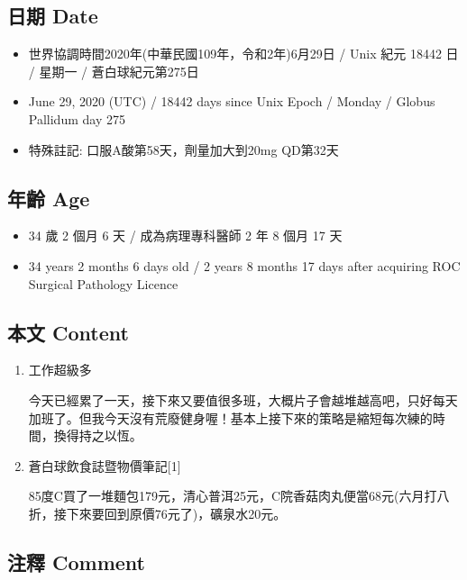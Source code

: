 \documentclass[a5paper, 11pt
]{book}
\providecommand{\tightlist}{%
  \setlength{\itemsep}{0pt}\setlength{\parskip}{0pt}}
\begin{document}
\hypertarget{ux65e5ux671f-date-24}{%
\subsection{日期 Date}\label{ux65e5ux671f-date-24}}

\begin{itemize}
\tightlist
\item
  世界協調時間2020年(中華民國109年，令和2年)6月29日 / Unix 紀元 18442 日
  / 星期一 / 蒼白球紀元第275日
\item
  June 29, 2020 (UTC) / 18442 days since Unix Epoch / Monday / Globus
  Pallidum day 275
\item
  特殊註記: 口服A酸第58天，劑量加大到20mg QD第32天
\end{itemize}

\hypertarget{ux5e74ux9f61-age-24}{%
\subsection{年齡 Age}\label{ux5e74ux9f61-age-24}}

\begin{itemize}
\tightlist
\item
  34 歲 2 個月 6 天 / 成為病理專科醫師 2 年 8 個月 17 天
\item
  34 years 2 months 6 days old / 2 years 8 months 17 days after
  acquiring ROC Surgical Pathology Licence
\end{itemize}

\hypertarget{ux672cux6587-content-24}{%
\subsection{本文 Content}\label{ux672cux6587-content-24}}

\begin{enumerate}
\def\labelenumi{\arabic{enumi}.}
\item
  工作超級多

  今天已經累了一天，接下來又要值很多班，大概片子會越堆越高吧，只好每天加班了。但我今天沒有荒廢健身喔！基本上接下來的策略是縮短每次練的時間，換得持之以恆。
\item
  蒼白球飲食誌暨物價筆記{[}1{]}

  85度C買了一堆麵包179元，清心普洱25元，C院香菇肉丸便當68元(六月打八折，接下來要回到原價76元了)，礦泉水20元。
\end{enumerate}

\hypertarget{ux6ce8ux91cb-comment-24}{%
\subsection{注釋 Comment}\label{ux6ce8ux91cb-comment-24}}
\end{document}
